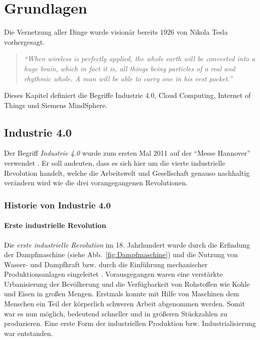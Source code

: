 \chapter{Grundlagen}
\label{cha:grundlagen}

Die Vernetzung aller Dinge wurde visionär bereits 1926 von Nikola Tesla \parencite{jeschke2017industrial} vorhergesagt. 

\begin {quote} \textit{``When wireless is perfectly applied, the whole earth will be converted into a huge brain, which in fact it is, all things being particles of a real and rhythmic whole. A man will be able to carry one in his vest pocket.''} \end{quote}

Dieses Kapitel definiert die Begriffe Industrie 4.0, Cloud Computing, Internet of Things und Siemens MindSphere.

\section{Industrie 4.0}

Der Begriff \textit{Industrie 4.0} wurde zum ersten Mal 2011 auf der "`Messe Hannover"' verwendet \parencite{jeschke2017industrial}. Er soll andeuten, dass es sich hier um die vierte industrielle Revolution handelt, welche die Arbeitswelt und Gesellschaft genauso nachhaltig verändern wird wie die drei vorangegangenen Revolutionen.

\subsection{Historie von Industrie 4.0}

\subsubsection{Erste industrielle Revolution}
Die \textit{erste industrielle Revolution} im 18. Jahrhundert wurde durch die Erfindung der Dampfmaschine (siehe Abb.~\ref{fig:Dampfmaschine}) und die Nutzung von Wasser- und Dampfkraft bzw. durch die Einführung mechanischer Produktionsanlagen eingeleitet \parencite{andelfinger2017industrie}. Vorausgegangen waren eine verstärkte Urbanisierung der Bevölkerung und die Verfügbarkeit von Rohstoffen wie Kohle und Eisen in großen Mengen. Erstmals konnte mit Hilfe von Maschinen dem Menschen ein Teil der körperlich schweren Arbeit abgenommen werden. Somit war es nun möglich, bedeutend schneller und in größeren Stückzahlen zu produzieren. Eine erste Form der industriellen Produktion bzw. Industrialisierung war entstanden.


